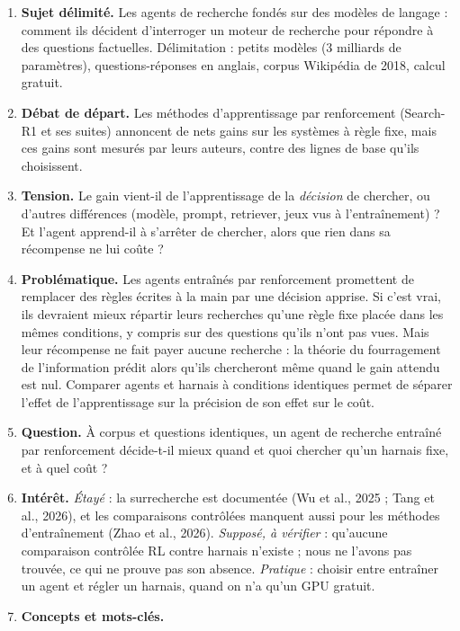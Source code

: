 \documentclass[10pt,a4paper]{article}
\begin{document}
\begin{enumerate}
\item \textbf{Sujet délimité.} Les agents de recherche fondés sur des modèles de langage : comment ils décident d'interroger un moteur de recherche pour répondre à des questions factuelles. Délimitation : petits modèles (3 milliards de paramètres), questions-réponses en anglais, corpus Wikipédia de 2018, calcul gratuit.
\item \textbf{Débat de départ.} Les méthodes d'apprentissage par renforcement (Search-R1 et ses suites) annoncent de nets gains sur les systèmes à règle fixe, mais ces gains sont mesurés par leurs auteurs, contre des lignes de base qu'ils choisissent.
\item \textbf{Tension.} Le gain vient-il de l'apprentissage de la \emph{décision} de chercher, ou d'autres différences (modèle, prompt, retriever, jeux vus à l'entraînement) ? Et l'agent apprend-il à s'arrêter de chercher, alors que rien dans sa récompense ne lui coûte ?
\item \textbf{Problématique.} Les agents entraînés par renforcement promettent de remplacer des règles écrites à la main par une décision apprise. Si c'est vrai, ils devraient mieux répartir leurs recherches qu'une règle fixe placée dans les mêmes conditions, y compris sur des questions qu'ils n'ont pas vues. Mais leur récompense ne fait payer aucune recherche : la théorie du fourragement de l'information prédit alors qu'ils chercheront même quand le gain attendu est nul. Comparer agents et harnais à conditions identiques permet de séparer l'effet de l'apprentissage sur la précision de son effet sur le coût.
\item \textbf{Question.} À corpus et questions identiques, un agent de recherche entraîné par renforcement décide-t-il mieux quand et quoi chercher qu'un harnais fixe, et à quel coût ?
\item \textbf{Intérêt.} \emph{Étayé} : la surrecherche est documentée (Wu et al., 2025 ; Tang et al., 2026), et les comparaisons contrôlées manquent aussi pour les méthodes d'entraînement (Zhao et al., 2026). \emph{Supposé, à vérifier} : qu'aucune comparaison contrôlée RL contre harnais n'existe ; nous ne l'avons pas trouvée, ce qui ne prouve pas son absence. \emph{Pratique} : choisir entre entraîner un agent et régler un harnais, quand on n'a qu'un GPU gratuit.
\item \textbf{Concepts et mots-clés.}


\end{enumerate}
\end{document}
